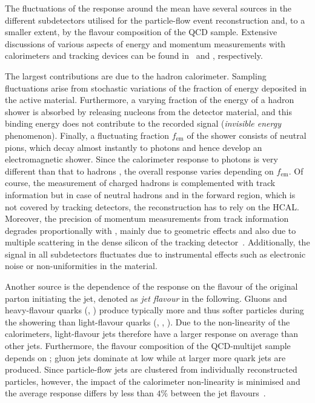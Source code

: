The fluctuations of the response around the mean have several sources in the different subdetectors utilised for the particle-flow event reconstruction and, to a smaller extent, by the flavour composition of the QCD sample.
Extensive discussions of various aspects of energy and momentum measurements with calorimeters and tracking devices can be found in~\cite{wigmans:calorimetry,wigmans:144} and \addref, respectively.

The largest contributions are due to the hadron calorimeter.
Sampling fluctuations arise from stochastic variations of the fraction of energy deposited in the active material.
Furthermore, a varying fraction of the energy of a hadron shower is absorbed by releasing nucleons from the detector material, and this binding energy does not contribute to the recorded signal (\textit{invisible energy} phenomenon).
Finally, a fluctuating fraction $f_{\text{em}}$ of the shower consists of neutral pions, which decay almost instantly to photons and hence develop an electromagnetic shower.
Since the calorimeter response to photons is very different than that to hadrons , the overall response varies depending on $f_{\text{em}}$.
Of course, the measurement of charged hadrons is complemented with track information but in case of neutral hadrons and in the forward region, which is not covered by tracking detectors, the reconstruction has to rely on the HCAL.
Moreover, the precision of momentum measurements from track information degrades proportionally with \pt, mainly due to geometric effects and also due to multiple scattering in the dense silicon of the tracking detector~\cite{RL1963381}.
Additionally, the signal in all subdetectors fluctuates due to instrumental effects such as electronic noise or non-uniformities in the material.

Another source is the dependence of the response on the flavour of the original parton initiating the jet, denoted as \textit{jet flavour}  in the following.
Gluons and heavy-flavour quarks (\qb, \qc) produce typically more and thus softer particles during the showering than light-flavour quarks (\qu, \qd, \qs).
Due to the non-linearity of the calorimeters, light-flavour jets therefore have a larger response on average than other jets.
Furthermore, the flavour composition of the QCD-multijet sample depends on \pt; gluon jets dominate at low \pt while at larger \pt more quark jets are produced.
Since particle-flow jets are clustered from individually reconstructed particles, however, the impact of the calorimeter non-linearity is minimised and the average response differs by less than $4\%$ between the jet flavours~\cite{1748-0221-6-11-P11002}.

